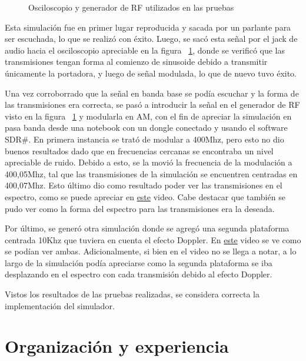 \documentclass[a4paper,10pt]{article}
\begin{document}
\begin{figure}[H]
\centering
{}
\caption{Osciloscopio y generador de RF utilizados en las pruebas}
\label{Test}
\end{figure}

Esta simulación fue en primer lugar reproducida y sacada por un parlante para ser escuchada, lo que se realizó con éxito. Luego, se sacó esta señal por el jack de audio hacia el osciloscopio apreciable en la figura ~\ref{Test}, donde se verificó que las transmisiones tengan forma al comienzo de sinusoide debido a transmitir únicamente la portadora, y luego de señal modulada, lo que de nuevo tuvo éxito.
\par
Una vez corroborrado que la señal en banda base se podía escuchar y la forma de las transmisiones era correcta, se pasó a introducir la señal en el generador de RF visto en la figura ~\ref{Test} y modularla en AM, con el fin de apreciar la simulación en pasa banda desde una notebook con un dongle conectado y usando el software SDR\#. En primera instancia se trató de modular a 400Mhz, pero esto no dio buenos resultados dado que en frecuencias cercanas se encontraba un nivel apreciable de ruido. Debido a esto, se la movió la frecuencia de la modulación a  400,05Mhz, tal que las transmisiones de la simulación se encuentren centradas en 400,07Mhz. Esto último dio como resultado poder ver las transmisiones en el espectro, como se puede apreciar en \textcolor{blue}{\href {https://drive.google.com/file/d/1FieeQKkBJIfpKAu_4E4Ik1SV4s9q1Qw6/view?usp=sharing}{este}} video. Cabe destacar que también se pudo ver como la forma del espectro para las transmisiones era la deseada.
\par
Por último, se generó otra simulación donde se agregó una segunda plataforma centrada 10Khz que tuviera en cuenta el efecto Doppler. En  \textcolor{blue}{\href {https://drive.google.com/file/d/1FfI8xw6hzwwgcrzLQBHW1-g3nXa6ZuWW/view?usp=sharing}{este}} video se ve como se podían ver ambas. Adicionalmente, si bien en el video no se llega a notar, a lo largo de la simulación podía apreciarse como la segunda plataforma se iba desplazando en el espectro con cada transmisión debido al efecto Doppler.
\par
Vistos los resultados de las pruebas realizadas, se considera correcta la implementación del simulador.

\section{Organización y experiencia}
\end{document}

